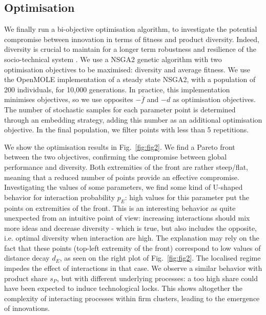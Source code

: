 \documentclass[letterpaper]{article}
\begin{document}
\subsection{Optimisation}

We finally run a bi-objective optimisation algorithm, to investigate the potential compromise between innovation in terms of fitness and product diversity. Indeed, diversity is crucial to maintain for a longer term robustness and resilience of the socio-technical system \citep{reinmoeller2005link}. We use a NSGA2 genetic algorithm with two optimisation objectives to be maximised: diversity and average fitness. We use the OpenMOLE implementation of a steady state NSGA2, with a population of 200 individuals, for 10,000 generations. In practice, this implementation minimises objectives, so we use opposites $- \bar{f}$ and $-d$ as optimisation objectives. The number of stochastic samples for each parameter point is determined through an embedding strategy, adding this number as an additional optimisation objective. In the final population, we filter points with less than 5 repetitions.

We show the optimisation results in Fig.~\ref{fig:fig2}. We find a Pareto front between the two objectives, confirming the compromise between global performance and diversity. Both extremities of the front are rather steep/flat, meaning that a reduced number of points provide an effective compromise. Investigating the values of some parameters, we find some kind of U-shaped behavior for interaction probability $p_E$: high values for this parameter put the points on extremities of the front. This is an interesting behavior as quite unexpected from an intuitive point of view: increasing interactions should mix more ideas and decrease diversity - which is true, but also includes the opposite, i.e. optimal diversity when interaction are high. The explanation may rely on the fact that these points (top-left extremity of the front) correspond to low values of distance decay $d_E$, as seen on the right plot of Fig.~\ref{fig:fig2}. The localised regime impedes the effect of interactions in that case. We observe a similar behavior with product share $s_P$, but with different underlying processes: a too high share could have been expected to induce technological locks. This shows altogether the complexity of interacting processes within firm clusters, leading to the emergence of innovations.
\end{document}
